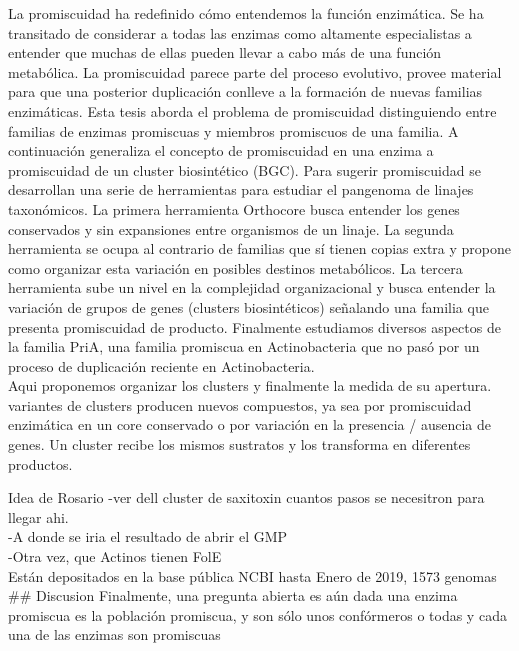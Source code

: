 \documentclass[12pt,twoside]{reedthesis}
\begin{document}
  La promiscuidad ha redefinido cómo entendemos la función enzimática. Se
  ha transitado de considerar a todas las enzimas como altamente
  especialistas a entender que muchas de ellas pueden llevar a cabo más de
  una función metabólica. La promiscuidad parece parte del proceso
  evolutivo, provee material para que una posterior duplicación conlleve a
  la formación de nuevas familias enzimáticas. Esta tesis aborda el
  problema de promiscuidad distinguiendo entre familias de enzimas
  promiscuas y miembros promiscuos de una familia. A continuación
  generaliza el concepto de promiscuidad en una enzima a promiscuidad de
  un cluster biosintético (BGC). Para sugerir promiscuidad se desarrollan
  una serie de herramientas para estudiar el pangenoma de linajes
  taxonómicos. La primera herramienta Orthocore busca entender los genes
  conservados y sin expansiones entre organismos de un linaje. La segunda
  herramienta se ocupa al contrario de familias que sí tienen copias extra
  y propone como organizar esta variación en posibles destinos
  metabólicos. La tercera herramienta sube un nivel en la complejidad
  organizacional y busca entender la variación de grupos de genes
  (clusters biosintéticos) señalando una familia que presenta promiscuidad
  de producto. Finalmente estudiamos diversos aspectos de la familia PriA,
  una familia promiscua en Actinobacteria que no pasó por un proceso de
  duplicación reciente en Actinobacteria.\\
  Aqui proponemos organizar los clusters y finalmente la medida de su
  apertura. variantes de clusters producen nuevos compuestos, ya sea por
  promiscuidad enzimática en un core conservado o por variación en la
  presencia / ausencia de genes. Un cluster recibe los mismos sustratos y
  los transforma en diferentes productos.
  
  Idea de Rosario -ver dell cluster de saxitoxin cuantos pasos se
  necesitron para llegar ahi.\\
  -A donde se iria el resultado de abrir el GMP\\
  -Otra vez, que Actinos tienen FolE\\
  Están depositados en la base pública NCBI hasta Enero de 2019, 1573
  genomas \#\# Discusion Finalmente, una pregunta abierta es aún dada una
  enzima promiscua es la población promiscua, y son sólo unos confórmeros
  o todas y cada una de las enzimas son promiscuas
  
\end{document}
